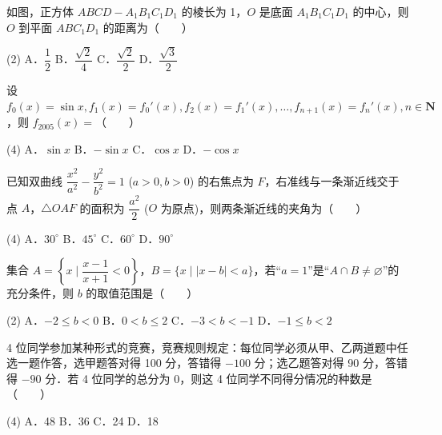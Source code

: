 \begin{question}
如图，正方体 $ABCD - A_1B_1C_1D_1$ 的棱长为 1，$O$ 是底面 $A_1B_1C_1D_1$ 的中心，则 $O$ 到平面 $ABC_1D_1$ 的距离为\mbox{（　　）}
\nopagebreak[4]
\begin{center}\end{center}
\nopagebreak[4]
\begin{gkopts}(2)
\task A．$\dfrac{1}{2}$
\task B．$\dfrac{\sqrt{2}}{4}$
\task C．$\dfrac{\sqrt{2}}{2}$
\task D．$\dfrac{\sqrt{3}}{2}$
\end{gkopts}

\end{question}
\begin{question}
设 $f_0(x) = \sin x, f_1(x) = f_0'(x), f_2(x) = f_1'(x), \dots, f_{n+1}(x) = f_n'(x), n \in \mathbf{N}$，则 $f_{2005}(x) =$\mbox{（　　）}

\begin{gkopts}(4)
\task A．$\sin x$
\task B．$-\sin x$
\task C．$\cos x$
\task D．$-\cos x$
\end{gkopts}

\end{question}
\begin{question}
已知双曲线 $\dfrac{x^2}{a^2} - \dfrac{y^2}{b^2} = 1$ ($a > 0, b > 0$) 的右焦点为 $F$，右准线与一条渐近线交于点 $A$，$\triangle OAF$ 的面积为 $\dfrac{a^2}{2}$ ($O$ 为原点)，则两条渐近线的夹角为\mbox{（　　）}

\begin{gkopts}(4)
\task A．$30^\circ$
\task B．$45^\circ$
\task C．$60^\circ$
\task D．$90^\circ$
\end{gkopts}

\end{question}
\begin{question}
集合 $A = \left\{x \mid \dfrac{x - 1}{x + 1} < 0\right\}$，$B = \{x \mid |x - b| < a\}$，若“$a = 1$”是“$A \cap B \neq \varnothing$”的充分条件，则 $b$ 的取值范围是\mbox{（　　）}

\begin{gkopts}(2)
\task A．$-2 \leqslant b < 0$
\task B．$0 < b \leqslant 2$
\task C．$-3 < b < -1$
\task D．$-1 \leqslant b < 2$
\end{gkopts}

\end{question}
\begin{question}
4 位同学参加某种形式的竞赛，竞赛规则规定：每位同学必须从甲、乙两道题中任选一题作答，选甲题答对得 100 分，答错得 $-100$ 分；选乙题答对得 90 分，答错得 $-90$ 分．若 4 位同学的总分为 0，则这 4 位同学不同得分情况的种数是\mbox{（　　）}

\begin{gkopts}(4)
\task A．48
\task B．36
\task C．24
\task D．18
\end{gkopts}

\end{question}
